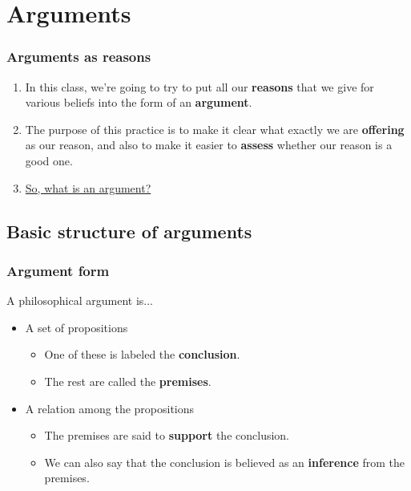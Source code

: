 \section{Arguments}

\begin{frame}
\frametitle{Arguments as reasons}

\begin{enumerate}
  \item In this class, we're going to try to put all our \textbf{reasons} that we give for various beliefs into the form of an \textbf{argument}.
  \item<2-> The purpose of this practice is to make it clear what exactly we are \textbf{offering} as our reason, and also to make it easier to \textbf{assess} whether our reason is a good one.
  \item<3->\href{https://www.youtube.com/watch?v=kQFKtI6gn9Y}{So, what is an argument?}
\end{enumerate}
  
\end{frame}

\subsection{Basic structure of arguments}

\begin{frame}
\frametitle{Argument form}

\begin{block}{A philosophical argument is...}
  \begin{itemize}
    \item<2-> A set of propositions
      \begin{itemize}
        \item One of these is labeled the \textbf{conclusion}.
        \item The rest are called the \textbf{premises}.
      \end{itemize}
    \item<3-> A relation among the propositions
      \begin{itemize}
        \item The premises are said to \textbf{support} the conclusion.
        \item We can also say that the conclusion is believed as an \textbf{inference} from the premises.
      \end{itemize}
  \end{itemize}
\end{block}
  
 
\end{frame}

